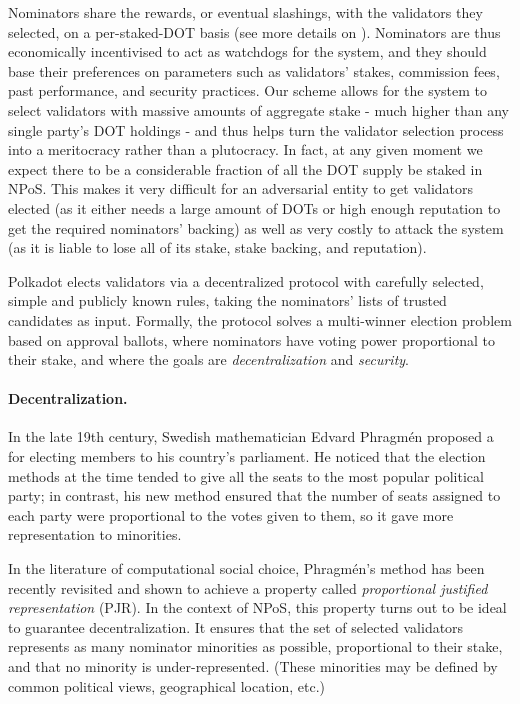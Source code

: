 Nominators share the rewards, or eventual slashings, with the validators they selected, on a per-staked-DOT basis
(see more details on ).
Nominators are thus economically incentivised to act as watchdogs for the system, and they should base their preferences 
on parameters such as validators' stakes, commission fees, past performance, and security practices.
Our scheme allows for the system to select validators with massive amounts of aggregate stake
- much higher than any single party's DOT holdings -
and thus helps turn the validator selection process into a meritocracy rather than a plutocracy.
In fact, at any given moment we expect there to be a considerable fraction of all the DOT supply be staked in NPoS.
This makes it very difficult for an adversarial entity to get validators elected
(as it either needs a large amount of DOTs or high enough reputation to get the required nominators' backing)
as well as very costly to attack the system (as it is liable to lose all of its stake, stake backing, and reputation).

Polkadot elects validators via a decentralized protocol with carefully selected, simple and publicly known rules,
taking the nominators' lists of trusted candidates as input. Formally, the protocol solves a multi-winner election
problem based on approval ballots, where nominators have voting power proportional to their stake,
and where the goals are \emph{decentralization} and \emph{security}.

\paragraph{Decentralization.} In the late 19th century, Swedish mathematician Edvard Phragm\'{e}n
proposed a  for electing members to his country’s parliament.
He noticed that the election methods at the time tended to give all the seats
to the most popular political party; in contrast, his new method ensured that the number of seats
assigned to each party were proportional to the votes given to them, so it gave more representation to minorities.

In the literature of computational social choice, Phragm\'{e}n's method has been recently revisited
and shown to achieve a property called \emph{proportional justified representation} (PJR).
In the context of NPoS, this property turns out to be ideal to guarantee decentralization.
It ensures that the set of selected validators represents as many nominator minorities as possible,
proportional to their stake, and that no minority is under-represented.
(These minorities may be defined by common political views, geographical location, etc.)

